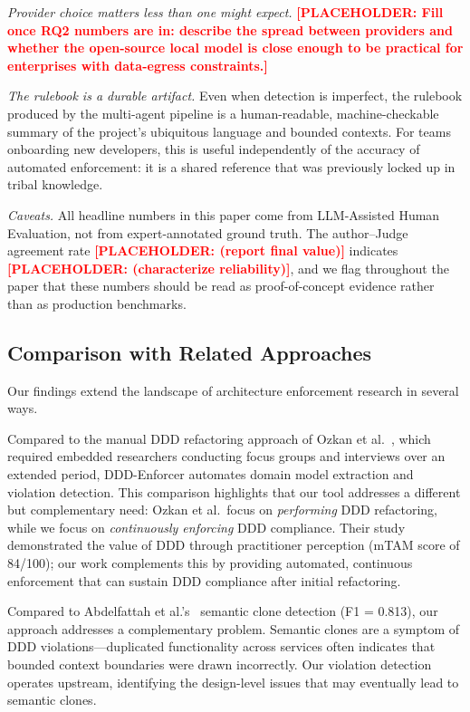 \documentclass[smallextended]{svjour3}
\newcommand{\placeholder}[1]{\textcolor{red}{\textbf{[PLACEHOLDER: #1]}}}
\begin{document}
\emph{Provider choice matters less than one might expect.}
\placeholder{Fill once RQ2 numbers are in: describe the spread between providers and whether the open-source local model is close enough to be practical for enterprises with data-egress constraints.}

\emph{The rulebook is a durable artifact.}
Even when detection is imperfect, the rulebook produced by the multi-agent pipeline is a human-readable, machine-checkable summary of the project's ubiquitous language and bounded contexts.
For teams onboarding new developers, this is useful independently of the accuracy of automated enforcement: it is a shared reference that was previously locked up in tribal knowledge.

\emph{Caveats.}
All headline numbers in this paper come from LLM-Assisted Human Evaluation, not from expert-annotated ground truth.
The author--Judge agreement rate \placeholder{(report final value)} indicates \placeholder{(characterize reliability)}, and we flag throughout the paper that these numbers should be read as proof-of-concept evidence rather than as production benchmarks.

\subsection{Comparison with Related Approaches}
\label{sec:disc_comparison}

Our findings extend the landscape of architecture enforcement research in several ways.

Compared to the manual DDD refactoring approach of Ozkan et al.~\cite{ozkan2023refactoring}, which required embedded researchers conducting focus groups and interviews over an extended period, DDD-Enforcer automates domain model extraction and violation detection.
This comparison highlights that our tool addresses a different but complementary need: Ozkan et al.\ focus on \emph{performing} DDD refactoring, while we focus on \emph{continuously enforcing} DDD compliance.
Their study demonstrated the value of DDD through practitioner perception (mTAM score of 84/100); our work complements this by providing automated, continuous enforcement that can sustain DDD compliance after initial refactoring.

Compared to Abdelfattah et al.'s~\cite{abdelfattah2023semantic} semantic clone detection (F1 = 0.813), our approach addresses a complementary problem.
Semantic clones are a symptom of DDD violations---duplicated functionality across services often indicates that bounded context boundaries were drawn incorrectly.
Our violation detection operates upstream, identifying the design-level issues that may eventually lead to semantic clones.
\end{document}
